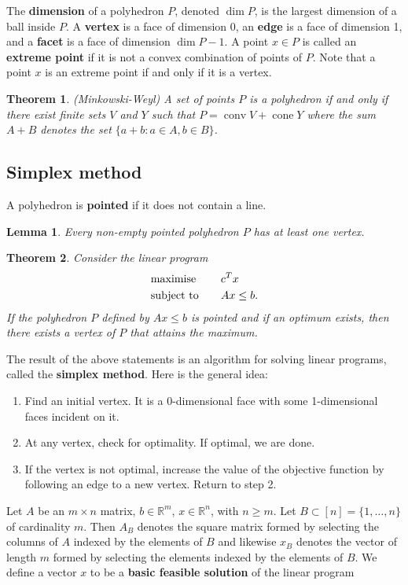 \documentclass[12pt]{article}
\newcommand{\R}{\mathbb{R}}
\DeclareMathOperator{\conv}{conv}
\DeclareMathOperator{\cone}{cone}
\theoremstyle{plain}
\newtheorem*{theorem*}{Theorem}
\newtheorem*{lemma*}{Lemma}
\begin{document}
\indent The \textbf{dimension} of a polyhedron $P$, denoted $\dim P$, is the largest dimension of a ball inside $P$. A \textbf{vertex} is a face of dimension 0, an \textbf{edge} is a face of dimension 1, and a \textbf{facet} is a face of dimension $\dim P - 1$. A point $x\in P$ is called an \textbf{extreme point} if it is not a convex combination of points of $P$. Note that a point $x$ is an extreme point if and only if it is a vertex.
\begin{theorem*}{\textup{(Minkowski-Weyl)}}
    A set of points $P$ is a polyhedron if and only if there exist finite sets $V$ and $Y$ such that $P = \conv V + \cone Y$ where the sum $A + B$ denotes the set $\{a + b : a\in A, b\in B\}$.
\end{theorem*}

\subsection{Simplex method}
A polyhedron is \textbf{pointed} if it does not contain a line.
\begin{lemma*}
    Every non-empty pointed polyhedron $P$ has at least one vertex.
\end{lemma*}
\begin{theorem*}
    Consider the linear program
    \begin{alignat*}{2}
        & \textup{maximise} & \quad & c^Tx \\
        & \textup{subject to} & & Ax \leq b.
    \end{alignat*}
    If the polyhedron $P$ defined by $Ax\leq b$ is pointed and if an optimum exists, then there exists a vertex of $P$ that attains the maximum.
\end{theorem*}
The result of the above statements is an algorithm for solving linear programs, called the \textbf{simplex method}. Here is the general idea:
\begin{enumerate}
    \item Find an initial vertex. It is a 0-dimensional face with some 1-dimensional faces incident on it.
    \item At any vertex, check for optimality. If optimal, we are done.
    \item If the vertex is not optimal, increase the value of the objective function by following an edge to a new vertex. Return to step 2.
\end{enumerate}
\indent Let $A$ be an $m\times n$ matrix, $b\in \R^m$, $x \in\R^n$, with $n \geq m$. Let $B\subset [n] =\{1,\ldots,n\}$ of cardinality $m$. Then $A_B$ denotes the square matrix formed by selecting the columns of $A$ indexed by the elements of $B$ and likewise $x_B$ denotes the vector of length $m$ formed by selecting the elements indexed by the elements of $B$. We define a vector $x$ to be a \textbf{basic feasible solution} of the linear program
\end{document}
